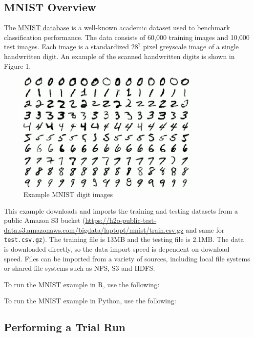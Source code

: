 {{\subsection{MNIST Overview} 

The \href{http://yann.lecun.com/exdb/mnist/}{MNIST database} is a well-known academic dataset used to benchmark classification performance.  The data consists of 60,000 training images and 10,000 test images. Each image is a standardized $28^2$ pixel greyscale image of a single handwritten digit.  An example of the scanned handwritten digits is shown in Figure 1. 

\begin{figure}[ht!]
\centering
\includegraphics[width=90mm]{./images/mnistdigits.jpg}
\caption{Example MNIST digit images \label{overflow}}
\end{figure}

This example downloads and imports the training and testing datasets from a public Amazon S3 bucket (\url{https://h2o-public-test-data.s3.amazonaws.com/bigdata/laptopt/mnist/train.csv.gz} and same for \texttt{test.csv.gz}).
The training file is 13MB and the testing file is 2.1MB. The data is downloaded directly, so the data import speed is dependent on download speed.  Files can be imported from a variety of sources, including local file systems or shared file systems such as NFS, S3 and HDFS.

\newpage
\waterExampleInR
To run the MNIST example in R, use the following: 


\waterExampleInPython
To run the MNIST example in Python, use the following: 


\newpage
\subsection{Performing a Trial Run}
\label{ssec:TrialRun} 

}}
